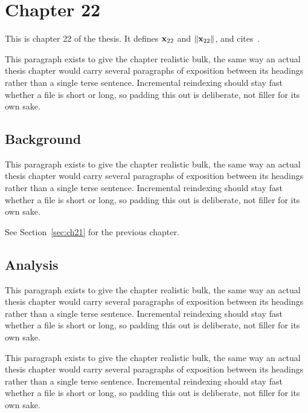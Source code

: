 \section{Chapter 22}
\label{sec:ch22}

This is chapter 22 of the thesis. It defines $\mathbf{x}_{22}$ and $\lVert \mathbf{x}_{22} \rVert$, and cites~\cite{ref1}.

This paragraph exists to give the chapter realistic bulk, the same way an actual thesis chapter would carry several paragraphs of exposition between its headings rather than a single terse sentence. Incremental reindexing should stay fast whether a file is short or long, so padding this out is deliberate, not filler for its own sake.

\subsection{Background}
\label{sec:ch22:background}

This paragraph exists to give the chapter realistic bulk, the same way an actual thesis chapter would carry several paragraphs of exposition between its headings rather than a single terse sentence. Incremental reindexing should stay fast whether a file is short or long, so padding this out is deliberate, not filler for its own sake.

See Section~\ref{sec:ch21} for the previous chapter.

\subsection{Analysis}
\label{sec:ch22:analysis}

This paragraph exists to give the chapter realistic bulk, the same way an actual thesis chapter would carry several paragraphs of exposition between its headings rather than a single terse sentence. Incremental reindexing should stay fast whether a file is short or long, so padding this out is deliberate, not filler for its own sake.

This paragraph exists to give the chapter realistic bulk, the same way an actual thesis chapter would carry several paragraphs of exposition between its headings rather than a single terse sentence. Incremental reindexing should stay fast whether a file is short or long, so padding this out is deliberate, not filler for its own sake.
